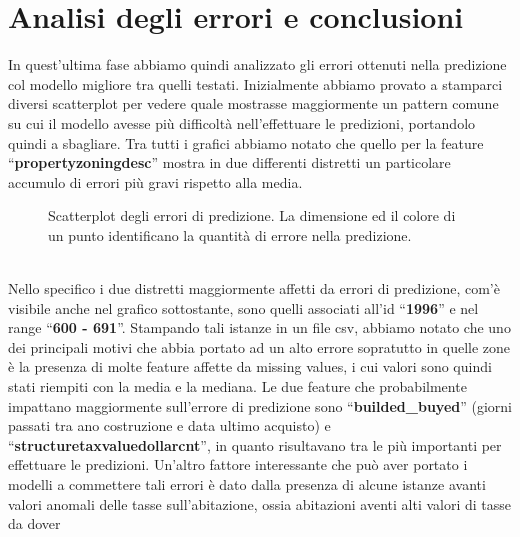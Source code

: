 \section*{Analisi degli errori e conclusioni}
In quest'ultima fase abbiamo quindi analizzato gli errori ottenuti nella predizione col modello migliore tra quelli testati.
Inizialmente abbiamo provato a stamparci diversi scatterplot per vedere quale mostrasse maggiormente un pattern comune su cui il modello avesse più difficoltà nell'effettuare le predizioni, portandolo quindi a sbagliare. 
Tra tutti i grafici abbiamo notato che quello per la feature ``\textbf{propertyzoningdesc}'' mostra in due differenti distretti un particolare accumulo di errori più gravi rispetto alla media.
\begin{figure}[htbp]
    \centerline{}
   \caption{Scatterplot degli errori di predizione. La dimensione ed il colore di un punto identificano la quantità di errore nella predizione.}
\end{figure}
\\
Nello specifico i due distretti maggiormente affetti da errori di predizione, com'è visibile anche nel grafico sottostante, sono quelli associati all'id ``\textbf{1996}'' e nel range ``\textbf{600 - 691}''. Stampando tali istanze in un file csv, abbiamo notato che uno dei principali motivi che abbia portato ad 
un alto errore sopratutto in quelle zone è la presenza di molte feature affette da missing values, i cui valori sono quindi stati riempiti con la media e la mediana. Le due feature che probabilmente impattano maggiormente sull'errore di predizione sono ``\textbf{builded\_buyed}'' (giorni passati tra ano costruzione e data ultimo acquisto) e 
``\textbf{structuretaxvaluedollarcnt}'', in quanto risultavano tra le più importanti per effettuare le predizioni. Un'altro fattore interessante che può aver portato i modelli a commettere tali errori è dato dalla presenza di alcune istanze avanti valori anomali delle tasse sull'abitazione, ossia abitazioni aventi alti valori di tasse da dover 
